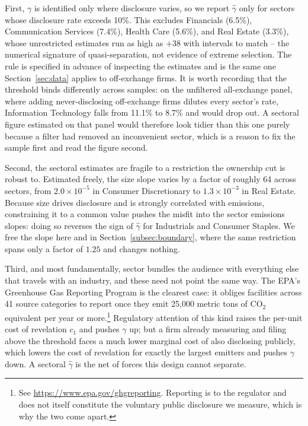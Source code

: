 \documentclass[a4paper,12pt]{article}
\begin{document}
First, $\gamma$ is identified only where disclosure varies, so we report $\hat\gamma$ only for sectors whose disclosure rate exceeds 10\%. This excludes Financials (6.5\%), Communication Services (7.4\%), Health Care (5.6\%), and Real Estate (3.3\%), whose unrestricted estimates run as high as $+38$ with intervals to match -- the numerical signature of quasi-separation, not evidence of extreme selection. The rule is specified in advance of inspecting the estimates and is the same one Section~\ref{sec:data} applies to off-exchange firms. It is worth recording that the threshold binds differently across samples: on the unfiltered all-exchange panel, where adding never-disclosing off-exchange firms dilutes every sector's rate, Information Technology falls from 11.1\% to 8.7\% and would drop out. A sectoral figure estimated on that panel would therefore look tidier than this one purely because a filter had removed an inconvenient sector, which is a reason to fix the sample first and read the figure second.

Second, the sectoral estimates are fragile to a restriction the ownership cut is robust to. Estimated freely, the size slope varies by a factor of roughly 64 across sectors, from $2.0\times10^{-5}$ in Consumer Discretionary to $1.3\times10^{-3}$ in Real Estate. Because size drives disclosure and is strongly correlated with emissions, constraining it to a common value pushes the misfit into the sector emissions slopes: doing so reverses the sign of $\hat\gamma$ for Industrials and Consumer Staples. We free the slope here and in Section~\ref{subsec:boundary}, where the same restriction spans only a factor of $1.25$ and changes nothing.

Third, and most fundamentally, sector bundles the audience with everything else that travels with an industry, and these need not point the same way. The EPA's Greenhouse Gas Reporting Program is the clearest case: it obliges facilities across 41 source categories to report once they emit 25{,}000 metric tons of CO$_2$ equivalent per year or more.\footnote{See \url{https://www.epa.gov/ghgreporting}. Reporting is to the regulator and does not itself constitute the voluntary public disclosure we measure, which is why the two come apart.} Regulatory attention of this kind raises the per-unit cost of revelation $c_1$ and pushes $\gamma$ up; but a firm already measuring and filing above the threshold faces a much lower marginal cost of also disclosing publicly, which lowers the cost of revelation for exactly the largest emitters and pushes $\gamma$ down. A sectoral $\hat\gamma$ is the net of forces this design cannot separate.
\end{document}
